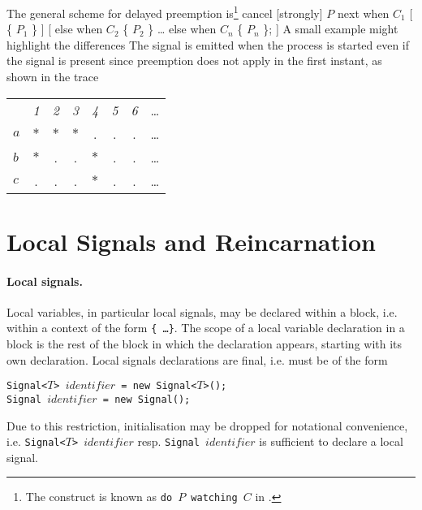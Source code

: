 {The general scheme for delayed preemption
is\footnote{The construct 
 is known as {\tt do $P$ 
watching $C$} in \esterel.}
%
\BEP
cancel [strongly]
    $P$
next when $C_{1}$ [ \{ $P_{1}$ \} ]
   [ else when $C_{2}$ \{ $P_{2}$ \}
     \ldots
     else when $C_{n}$ \{ $P_{n}$ \};
   ]
\EEP
%
A small example might highlight the differences
%
%
The signal  is emitted when the process is started even if the signal
 is present since preemption does not apply in the first instant, as shown in the trace
\begin{center}
  \leavevmode
  \begin{tabular}[]{l@{\quad}||@{\quad} ccccccc}
    \hline\hline   
     &{\footnotesize \textit{1}}&{\footnotesize \textit{2}}
     &{\footnotesize \textit{3}}&{\footnotesize \textit{4}}
     &{\footnotesize \textit{5}}&{\footnotesize \textit{6}}&\ldots
   \\  
    \hbox{$a$} &$*$&$*$&$*$&.&.&.&\ldots
   \\
    \hbox{$b$} &$*$&.&.&$*$&.&.&\ldots
   \\
    \hbox{$c$} &.&.&.&$*$&.&.&\ldots
    \\     
    \hline\hline
  \end{tabular}
\end{center} 

}


\newpage
\section{Local Signals and Reincarnation}\label{local-signals}

\paragraph{Local signals.}

Local variables, in particular local signals, may be declared within a block, i.e. within a context of the form \texttt{\{ \ldots \}}. The scope of a local variable declaration in a block is the rest of the block in which the declaration appears, starting with its own declaration.
Local signals declarations are final, i.e. must be of the form
\begin{center}
\texttt{Signal<$T$> $identifier$\ = new Signal<$T$>();}\\
\texttt{Signal $identifier$\ = new Signal();}
\end{center}
Due to this restriction, initialisation may be dropped for notational convenience, i.e. \texttt{Signal<$T$> $identifier$} resp. \texttt{Signal $identifier$} is sufficient to
declare a local signal.

